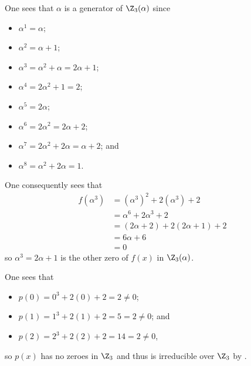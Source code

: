 \begin{questions}
    One sees that $\alpha$ is a generator of $\Z_3(\alpha)$ since
    \begin{multicols}{2}
        \begin{itemize}
            \item $\alpha^1 = \alpha$;
            \item $\alpha^2 = \alpha + 1$;
            \item $\alpha^3 = \alpha^2 + \alpha = 2\alpha + 1$;
            \item $\alpha^4 = 2\alpha^2 + 1 = 2$;
            \item $\alpha^5 = 2\alpha$;
            \item $\alpha^6 = 2\alpha^2 = 2\alpha + 2$;
            \item $\alpha^7 = 2\alpha^2 + 2\alpha = \alpha + 2$; and
            \item $\alpha^8 = \alpha^2 + 2\alpha = 1$.
        \end{itemize}
    \end{multicols}
    One consequently sees that
    \begin{align*}
        f(\alpha^3) &= (\alpha^3)^2 + 2(\alpha^3) + 2\\
        &= \alpha^6 + 2\alpha^3 + 2\\
        &= (2\alpha + 2) + 2(2\alpha + 1) + 2\\
        &= 6\alpha + 6\\
        &= 0
    \end{align*}
    so $\alpha^3 = 2\alpha + 1$ is the other zero of $f(x)$ in $\Z_3(\alpha)$.

    \item \begin{partquestions}{\roman*}
        \item One sees that
        \begin{itemize}
            \item $p(0) = 0^3 + 2(0) + 2 = 2 \neq 0$;
            \item $p(1) = 1^3 + 2(1) + 2 = 5 = 2 \neq 0$; and
            \item $p(2) = 2^3 + 2(2) + 2 = 14 = 2 \neq 0$,
        \end{itemize}
        so $p(x)$ has no zeroes in $\Z_3$ and thus is irreducible over $\Z_3$ by .


\end{partquestions}
\end{questions}
